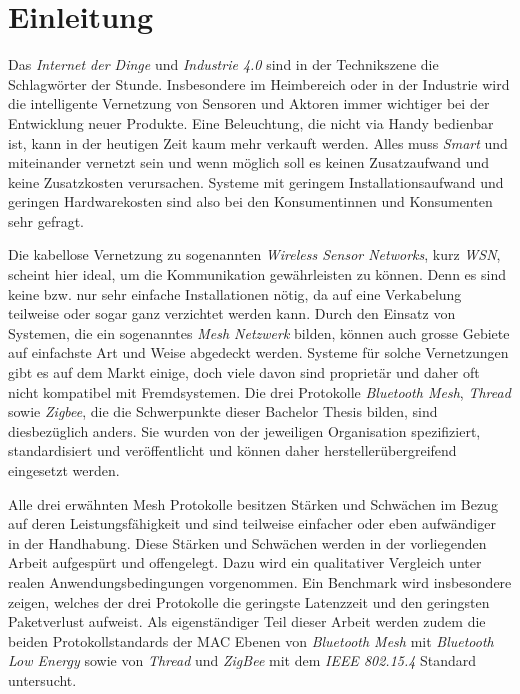 \clearpage

\section{Einleitung}\label{sec:Einleitung}

Das \textit{Internet der Dinge} und \textit{Industrie 4.0} sind in der Technikszene die Schlagwörter der Stunde.
Insbesondere im Heimbereich oder in der Industrie wird die intelligente Vernetzung von Sensoren und Aktoren immer wichtiger bei der Entwicklung neuer Produkte.
Eine Beleuchtung, die nicht via Handy bedienbar ist, kann in der heutigen Zeit kaum mehr verkauft werden.
Alles muss \textit{Smart} und miteinander vernetzt sein und wenn möglich soll es keinen Zusatzaufwand und keine Zusatzkosten verursachen.
Systeme mit geringem Installationsaufwand und geringen Hardwarekosten sind also bei den Konsumentinnen und Konsumenten sehr gefragt.

Die kabellose Vernetzung zu sogenannten \textit{Wireless Sensor Networks}, kurz \textit{WSN}, scheint hier ideal, um die Kommunikation gewährleisten zu können.
Denn es sind keine bzw. nur sehr einfache Installationen nötig, da auf eine Verkabelung teilweise oder sogar ganz verzichtet werden kann.
Durch den Einsatz von Systemen, die ein sogenanntes \textit{Mesh Netzwerk} bilden, können auch grosse Gebiete auf einfachste Art und Weise abgedeckt werden. 
Systeme für solche Vernetzungen gibt es auf dem Markt einige, doch viele davon sind proprietär und daher oft nicht kompatibel mit Fremdsystemen.
Die drei Protokolle \textit{Bluetooth Mesh}, \textit{Thread} sowie \textit{Zigbee}, die die Schwerpunkte dieser Bachelor Thesis bilden, sind diesbezüglich anders.
Sie wurden von der jeweiligen Organisation spezifiziert, standardisiert und veröffentlicht und können daher herstellerübergreifend eingesetzt werden.

Alle drei erwähnten Mesh Protokolle besitzen Stärken und Schwächen im Bezug auf deren Leistungsfähigkeit und sind teilweise einfacher oder eben aufwändiger in der Handhabung.  
Diese Stärken und Schwächen werden in der vorliegenden Arbeit aufgespürt und offengelegt.
Dazu wird ein qualitativer Vergleich unter realen Anwendungsbedingungen vorgenommen.
Ein Benchmark wird insbesondere zeigen, welches der drei Protokolle die geringste Latenzzeit und den geringsten Paketverlust aufweist.
Als eigenständiger Teil dieser Arbeit werden zudem die beiden Protokollstandards der MAC Ebenen von \textit{Bluetooth Mesh} mit \textit{Bluetooth Low Energy} sowie von \textit{Thread} und \textit{ZigBee} mit dem \textit{IEEE 802.15.4} Standard untersucht.

